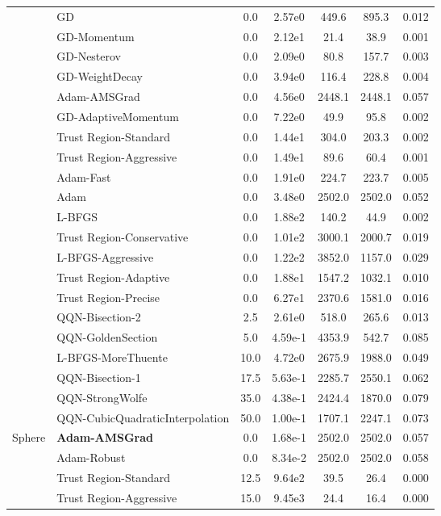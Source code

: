 \documentclass{article}
\begin{document}
\begin{table}[htbp]
{\begin{tabular}{p{2.5cm}p{2.5cm}*{5}{c}}
 & GD & 0.0 & 2.57e0 & 449.6 & 895.3 & 0.012 \\
 & GD-Momentum & 0.0 & 2.12e1 & 21.4 & 38.9 & 0.001 \\
 & GD-Nesterov & 0.0 & 2.09e0 & 80.8 & 157.7 & 0.003 \\
 & GD-WeightDecay & 0.0 & 3.94e0 & 116.4 & 228.8 & 0.004 \\
 & Adam-AMSGrad & 0.0 & 4.56e0 & 2448.1 & 2448.1 & 0.057 \\
 & GD-AdaptiveMomentum & 0.0 & 7.22e0 & 49.9 & 95.8 & 0.002 \\
 & Trust Region-Standard & 0.0 & 1.44e1 & 304.0 & 203.3 & 0.002 \\
 & Trust Region-Aggressive & 0.0 & 1.49e1 & 89.6 & 60.4 & 0.001 \\
 & Adam-Fast & 0.0 & 1.91e0 & 224.7 & 223.7 & 0.005 \\
 & Adam & 0.0 & 3.48e0 & 2502.0 & 2502.0 & 0.052 \\
 & L-BFGS & 0.0 & 1.88e2 & 140.2 & 44.9 & 0.002 \\
 & Trust Region-Conservative & 0.0 & 1.01e2 & 3000.1 & 2000.7 & 0.019 \\
 & L-BFGS-Aggressive & 0.0 & 1.22e2 & 3852.0 & 1157.0 & 0.029 \\
 & Trust Region-Adaptive & 0.0 & 1.88e1 & 1547.2 & 1032.1 & 0.010 \\
 & Trust Region-Precise & 0.0 & 6.27e1 & 2370.6 & 1581.0 & 0.016 \\
 & QQN-Bisection-2 & 2.5 & 2.61e0 & 518.0 & 265.6 & 0.013 \\
 & QQN-GoldenSection & 5.0 & 4.59e-1 & 4353.9 & 542.7 & 0.085 \\
 & L-BFGS-MoreThuente & 10.0 & 4.72e0 & 2675.9 & 1988.0 & 0.049 \\
 & QQN-Bisection-1 & 17.5 & 5.63e-1 & 2285.7 & 2550.1 & 0.062 \\
 & QQN-StrongWolfe & 35.0 & 4.38e-1 & 2424.4 & 1870.0 & 0.079 \\
 & QQN-CubicQuadraticInterpolation & 50.0 & 1.00e-1 & 1707.1 & 2247.1 & 0.073 \\
\midrule
\multirow{25}{*}{Sphere} & \textbf{Adam-AMSGrad} & 0.0 & 1.68e-1 & 2502.0 & 2502.0 & 0.057 \\
 & Adam-Robust & 0.0 & 8.34e-2 & 2502.0 & 2502.0 & 0.058 \\
 & Trust Region-Standard & 12.5 & 9.64e2 & 39.5 & 26.4 & 0.000 \\
 & Trust Region-Aggressive & 15.0 & 9.45e3 & 24.4 & 16.4 & 0.000 \\

\end{tabular}}
\end{table}
\end{document}

